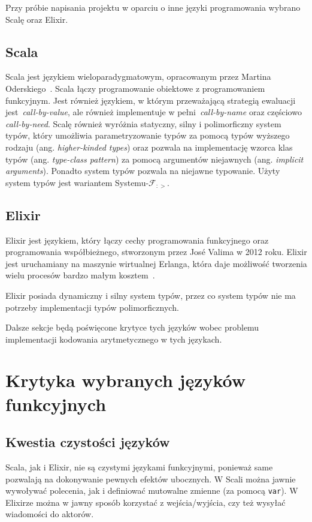 \documentclass[../praca.tex]{subfiles}
\begin{document}
Przy próbie napisania projektu w oparciu o inne języki programowania wybrano 
Scalę oraz Elixir. 

\subsection{Scala}

Scala jest językiem wieloparadygmatowym, opracowanym przez 
Martina Oderskiego~\cite{Odersky:BHS}. Scala łączy programowanie
obiektowe z programowaniem funkcyjnym. Jest również językiem,
w którym przeważającą strategią ewaluacji jest~\emph{call-by-value},
ale również implementuje w pełni~\emph{call-by-name} oraz częściowo
\emph{call-by-need}. Scalę również wyróżnia statyczny, silny i polimorficzny system typów,
który umożliwia parametryzowanie typów za pomocą typów wyższego rodzaju
(ang. \emph{higher-kinded types}) oraz pozwala na implementację
wzorca klas typów (ang. \emph{type-class pattern}) za pomocą
argumentów niejawnych (ang. \emph{implicit arguments}). Ponadto
system typów pozwala na niejawne typowanie. Użyty system typów
jest wariantem Systemu-\(\mathcal{F}_{:>}\).

\subsection{Elixir}

Elixir jest językiem, który łączy cechy programowania funkcyjnego
oraz programowania współbieżnego, stworzonym przez Jos{\' e} Valima
w 2012 roku. Elixir jest uruchamiany na maszynie wirtualnej Erlanga,
która daje możliwość tworzenia wielu procesów bardzo małym 
kosztem~\cite{Juric:EiA}.

Elixir posiada dynamiczny i silny system typów, przez co system typów
nie ma potrzeby implementacji typów polimorficznych.

Dalsze sekcje będą poświęcone krytyce tych języków wobec problemu implementacji
kodowania arytmetycznego w tych językach.

\section{Krytyka wybranych języków funkcyjnych}

\subsection{Kwestia czystości języków}

Scala, jak i Elixir, nie są czystymi językami funkcyjnymi, ponieważ
same pozwalają na dokonywanie pewnych efektów ubocznych. W Scali
można jawnie wywoływać polecenia, jak i definiować mutowalne zmienne
(za pomocą \texttt{var}). W Elixirze można w jawny sposób
korzystać z wejścia/wyjścia, czy też wysyłać wiadomości do aktorów.
\end{document}
